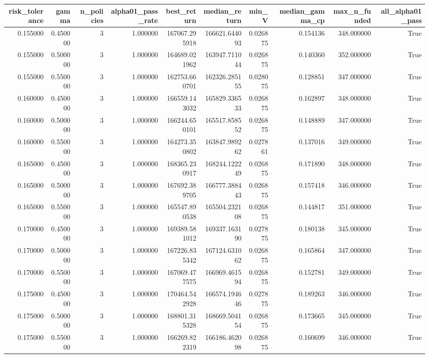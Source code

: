 \begin{tabular}{rrrrrrrrrr}
\toprule
risk\_tolerance & gamma & n\_policies & alpha01\_pass\_rate & best\_return & median\_return & min\_V & median\_gamma\_cp & max\_n\_funded & all\_alpha01\_pass \\
\midrule
0.155000 & 0.450000 & 3 & 1.000000 & 167067.295918 & 166621.644093 & 0.026875 & 0.154136 & 348.000000 & True \\
0.155000 & 0.500000 & 3 & 1.000000 & 164689.021962 & 163947.711044 & 0.026875 & 0.140360 & 352.000000 & True \\
0.155000 & 0.550000 & 3 & 1.000000 & 162753.660701 & 162326.285155 & 0.028075 & 0.128851 & 347.000000 & True \\
0.160000 & 0.450000 & 3 & 1.000000 & 166559.143032 & 165829.336533 & 0.026875 & 0.162897 & 348.000000 & True \\
0.160000 & 0.500000 & 3 & 1.000000 & 166244.650101 & 165517.858552 & 0.026875 & 0.148889 & 347.000000 & True \\
0.160000 & 0.550000 & 3 & 1.000000 & 164273.350802 & 163847.989262 & 0.027861 & 0.137016 & 349.000000 & True \\
0.165000 & 0.450000 & 3 & 1.000000 & 168365.230917 & 168244.122249 & 0.026875 & 0.171890 & 348.000000 & True \\
0.165000 & 0.500000 & 3 & 1.000000 & 167692.389705 & 166777.388443 & 0.026875 & 0.157418 & 346.000000 & True \\
0.165000 & 0.550000 & 3 & 1.000000 & 165547.890538 & 165504.232108 & 0.026875 & 0.144817 & 351.000000 & True \\
0.170000 & 0.450000 & 3 & 1.000000 & 169389.581012 & 169337.163190 & 0.027875 & 0.180138 & 345.000000 & True \\
0.170000 & 0.500000 & 3 & 1.000000 & 167226.835342 & 167124.631062 & 0.026875 & 0.165864 & 347.000000 & True \\
0.170000 & 0.550000 & 3 & 1.000000 & 167069.477575 & 166969.461594 & 0.026875 & 0.152781 & 349.000000 & True \\
0.175000 & 0.450000 & 3 & 1.000000 & 170464.542928 & 166574.194646 & 0.027875 & 0.189263 & 346.000000 & True \\
0.175000 & 0.500000 & 3 & 1.000000 & 168801.315328 & 168669.504154 & 0.026875 & 0.173665 & 345.000000 & True \\
0.175000 & 0.550000 & 3 & 1.000000 & 166269.822319 & 166186.462098 & 0.026875 & 0.160699 & 346.000000 & True \\
\bottomrule
\end{tabular}
